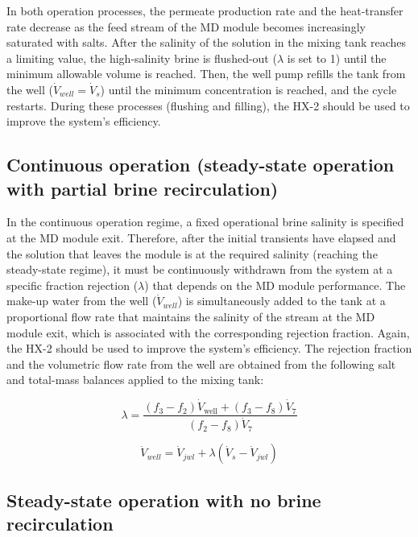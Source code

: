 \documentclass[14pt,letterpaper,fleqn]{extarticle}
\begin{document}
In both operation processes, the permeate production rate and the heat-transfer
rate decrease as the feed stream of the MD module becomes increasingly saturated with
salts. After the salinity of the solution in the mixing tank reaches a limiting value,
the high-salinity brine is flushed-out ($\lambda$ is set to 1) until the minimum allowable volume
is reached. Then, the well pump refills the tank from the well ($\dot{V}_{well}=\dot{V}_s$) until the minimum concentration is reached, and the cycle restarts. During these
processes (flushing and filling), the HX-2 should be used to improve the system's
efficiency.

\subsection{Continuous operation (steady-state operation with partial brine recirculation)}
\label{subsec:continuous}

In the continuous operation regime, a fixed operational brine salinity is specified at
the MD module exit. Therefore, after the initial transients have elapsed and the solution
that leaves the module is at the required salinity (reaching the steady-state regime), it
must be continuously withdrawn from the system at a specific fraction rejection ($\lambda$)
that depends on the MD module performance. The make-up water from the well
($\dot{V}_{well}$) is simultaneously added to the tank at a proportional flow rate that
maintains the salinity of the stream at the MD module exit, which is associated with the
corresponding rejection fraction. Again, the HX-2 should be used to improve the system's
efficiency. The rejection fraction and the volumetric flow rate from the well are
obtained from the following salt and total-mass balances applied to the mixing tank:

\begin{equation}
\lambda
=
\frac{
\left(f_{3}-f_{2}\right)\dot{V}_{\mathrm{well}}
+
\left(f_{3}-f_{8}\right)\dot{V}_{7}
}{
\left(f_{2}-f_{8}\right)\dot{V}_{7}
}
\label{eq:l}
\end{equation}

\begin{equation}
\dot{V}_{well}
=
\dot{V}_{jwl}
+
\lambda
\left(\dot{V}_s-\dot{V}_{jwl}\right)
\label{eq:Vwell}
\end{equation}

\subsection{Steady-state operation with no brine recirculation}
\label{subsec:steady-state}
\end{document}
